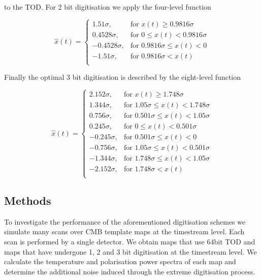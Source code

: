 \documentclass[apj]{emulateapj}
\begin{document}
to the TOD. For 2 bit digitisation we apply the four-level function

\[ \hat{x}(t) = \left\{ \begin{array}{lr}
1.51 \sigma, & \text{for } x(t) \geq 0.9816 \sigma\\
0.4528 \sigma, & \text{for } 0 \leq x(t) < 0.9816 \sigma\\
-0.4528 \sigma, & \text{for } 0.9816 \sigma \leq x(t) < 0\\
-1.51 \sigma, & \text{for } 0.9816 \sigma < x(t)\\
\end{array} \right. \]

Finally the optimal 3 bit digitisation is described by the eight-level function

\[ \hat{x}(t) = \left\{ \begin{array}{lr}
2.152 \sigma, & \text{for } x(t) \geq 1.748 \sigma\\
1.344 \sigma, & \text{for } 1.05 \sigma \leq x(t) < 1.748 \sigma\\
0.756 \sigma, & \text{for } 0.501 \sigma \leq x(t) < 1.05 \sigma\\
0.245 \sigma, & \text{for } 0 \leq x(t) < 0.501 \sigma\\
-0.245 \sigma, & \text{for } 0.501 \sigma \leq x(t) < 0\\
-0.756 \sigma, & \text{for } 1.05 \sigma \leq x(t) < 0.501 \sigma\\
-1.344 \sigma, & \text{for } 1.748 \sigma \leq x(t) < 1.05 \sigma\\
-2.152 \sigma, & \text{for } 1.748 \sigma < x(t)\\
\end{array} \right. \]


\subsection{Methods}
\label{subsec:method}

To investigate the performance of the aforementioned digitisation schemes we simulate many scans over CMB template maps at the timestream level. Each scan is performed by a single detector. We obtain maps that use 64bit TOD and maps that have undergone 1, 2 and 3 bit digitisation at the timestream level. We calculate the temperature and polarisation power spectra of each map and determine the additional noise induced through the extreme digitisation process.
\end{document}
